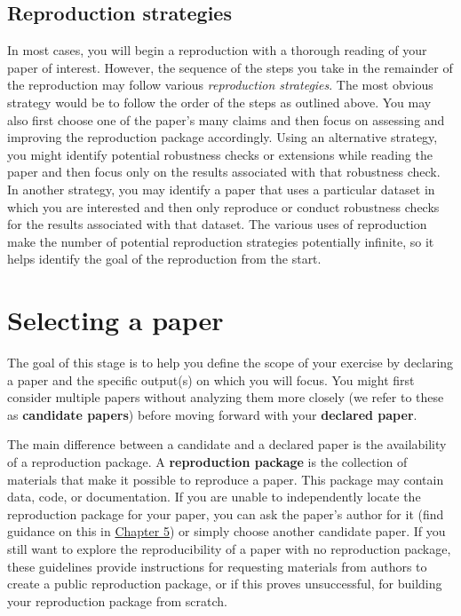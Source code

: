 \documentclass[
]{book}
\begin{document}
\hypertarget{reproduction-strategies}{%
\section*{Reproduction strategies}\label{reproduction-strategies}}

In most cases, you will begin a reproduction with a thorough reading of your paper of interest. However, the sequence of the steps you take in the remainder of the reproduction may follow various \emph{reproduction strategies}. The most obvious strategy would be to follow the order of the steps as outlined above. You may also first choose one of the paper's many claims and then focus on assessing and improving the reproduction package accordingly. Using an alternative strategy, you might identify potential robustness checks or extensions while reading the paper and then focus only on the results associated with that robustness check. In another strategy, you may identify a paper that uses a particular dataset in which you are interested and then only reproduce or conduct robustness checks for the results associated with that dataset. The various uses of reproduction make the number of potential reproduction strategies potentially infinite, so it helps identify the goal of the reproduction from the start.

\hypertarget{selecting-a-paper}{%
\chapter{Selecting a paper}\label{selecting-a-paper}}

The goal of this stage is to help you define the scope of your exercise by declaring a paper and the specific output(s) on which you will focus. You might first consider multiple papers without analyzing them more closely (we refer to these as \textbf{candidate papers}) before moving forward with your \textbf{declared paper}.

The main difference between a candidate and a declared paper is the availability of a reproduction package. A \textbf{reproduction package} is the collection of materials that make it possible to reproduce a paper. This package may contain data, code, or documentation. If you are unable to independently locate the reproduction package for your paper, you can ask the paper's author for it (find guidance on this in \href{https://bitss.github.io/ACRE/guidance-for-a-constructive-exchange-between-reproducers-and-original-authors.html}{Chapter 5}) or simply choose another candidate paper. If you still want to explore the reproducibility of a paper with no reproduction package, these guidelines provide instructions for requesting materials from authors to create a public reproduction package, or if this proves unsuccessful, for building your reproduction package from scratch.
\end{document}
